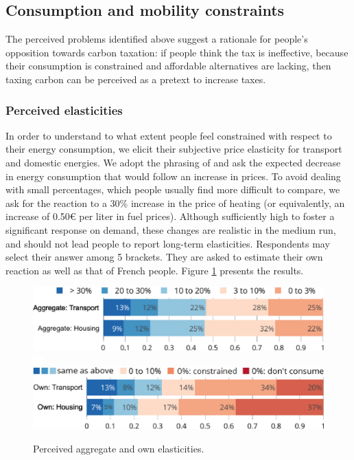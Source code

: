 \documentclass[english,5p,authoryear]{elsarticle}
\begin{document}
    \subsection{Consumption and mobility constraints}

The perceived problems identified above suggest a rationale for people's opposition towards carbon taxation: if people think the tax is ineffective, because their consumption is constrained and affordable alternatives are lacking, then taxing carbon can be perceived as a pretext to increase taxes. %

    \subsubsection{Perceived elasticities}

In order to understand to what extent people feel constrained with respect to their energy consumption, we elicit their subjective price elasticity for transport and domestic energies. We adopt the phrasing of \citet{baranzini_effectiveness_2017} and ask the expected decrease in energy consumption that would follow an increase in prices. To avoid dealing with small percentages, which people usually find more difficult to compare, we ask for the reaction to a 30\% increase in the price of heating (or equivalently, an increase of 0.50\euro{} per liter in fuel prices). Although sufficiently high to foster a significant response on demand, these changes are realistic in the medium run, and should not lead people to report long-term elasticities. Respondents may select their answer among 5 brackets. They are asked to estimate their own reaction as well as that of French people. Figure \ref{fig:elasticities_agg} presents the results.

%

\begin{figure}[t]
\centering
\includegraphics[width=\columnwidth]{Images_EPS/elasticities_agg_valb.eps}
\includegraphics[height=0.3cm]{Images_EPS/blank.eps}
\includegraphics[width=\columnwidth]{Images_EPS/elasticities_perso_valbuena.eps}
\caption{Perceived aggregate and own elasticities.}
\label{fig:elasticities_agg}
\end{figure}
\end{document}
